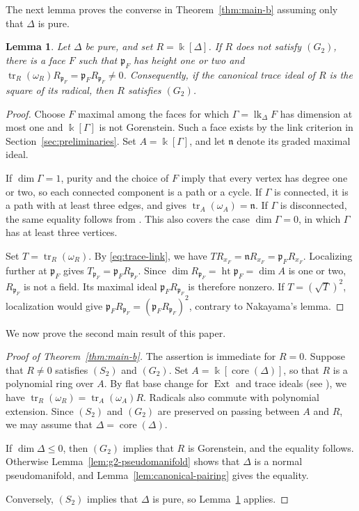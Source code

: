\documentclass[a4paper,11pt]{amsart}
\theoremstyle{plain}
\newtheorem{lemma}[theorem]{Lemma}
\theoremstyle{definition}
\theoremstyle{remark}
\DeclareMathOperator{\tr}{tr}
\DeclareMathOperator{\Ext}{Ext}
\DeclareMathOperator{\core}{core}
\newcommand{\kk}{\Bbbk}
\begin{document}
The next lemma proves the converse in Theorem~\ref{thm:main-b} assuming only that $\Delta$ is pure.

\begin{lemma}\label{lem:low-dimensional-trace}
Let $\Delta$ be pure, and set $R=\kk[\Delta]$. If $R$ does not satisfy $(G_2)$, there is a face $F$ such that $\mathfrak p_F$ has height one or two and $\tr_R(\omega_R)R_{\mathfrak p_F}=\mathfrak p_FR_{\mathfrak p_F}\ne0$. Consequently, if the canonical trace ideal of $R$ is the square of its radical, then $R$ satisfies $(G_2)$.
\end{lemma}
\begin{proof}
Choose $F$ maximal among the faces for which $\Gamma=\operatorname{lk}_\Delta F$ has dimension at most one and $\kk[\Gamma]$ is not Gorenstein. Such a face exists by the link criterion in Section~\ref{sec:preliminaries}. Set $A=\kk[\Gamma]$, and let $\mathfrak n$ denote its graded maximal ideal.

If $\dim\Gamma=1$, purity and the choice of $F$ imply that every vertex has degree one or two, so each connected component is a path or a cycle. If $\Gamma$ is connected, it is a path with at least three edges, and \cite[Theorem~4.19\,(3)]{KM26} gives $\tr_A(\omega_A)=\mathfrak n$. If $\Gamma$ is disconnected, the same equality follows from \cite[Theorem~4.21\,(2)]{KM26}. This also covers the case $\dim\Gamma=0$, in which $\Gamma$ has at least three vertices.

Set $T=\tr_R(\omega_R)$. By \eqref{eq:trace-link}, we have $TR_{x_F}=\mathfrak nR_{x_F}=\mathfrak p_FR_{x_F}$. Localizing further at $\mathfrak p_F$ gives $T_{\mathfrak p_F}=\mathfrak p_FR_{\mathfrak p_F}$. Since $\dim R_{\mathfrak p_F}=\operatorname{ht}\mathfrak p_F=\dim A$ is one or two, $R_{\mathfrak p_F}$ is not a field. Its maximal ideal $\mathfrak p_FR_{\mathfrak p_F}$ is therefore nonzero. If $T=(\sqrt T)^2$, localization would give $\mathfrak p_FR_{\mathfrak p_F}=(\mathfrak p_FR_{\mathfrak p_F})^2$, contrary to Nakayama's lemma.
\end{proof}

We now prove the second main result of this paper.

\begin{proof}[Proof of Theorem~\ref{thm:main-b}]
The assertion is immediate for $R=0$. Suppose that $R\ne0$ satisfies $(S_2)$ and $(G_2)$. Set $A=\kk[\core(\Delta)]$, so that $R$ is a polynomial ring over $A$. By flat base change for $\Ext$ and trace ideals (see \cite[Lemma~1.5\,(iii)]{HHS}), we have $\tr_R(\omega_R)=\tr_A(\omega_A)R$. Radicals also commute with polynomial extension. Since $(S_2)$ and $(G_2)$ are preserved on passing between $A$ and $R$, we may assume that $\Delta=\core(\Delta)$.

If $\dim\Delta\leq0$, then $(G_2)$ implies that $R$ is Gorenstein, and the equality follows. Otherwise Lemma~\ref{lem:g2-pseudomanifold} shows that $\Delta$ is a normal pseudomanifold, and Lemma~\ref{lem:canonical-pairing} gives the equality.

Conversely, $(S_2)$ implies that $\Delta$ is pure, so Lemma~\ref{lem:low-dimensional-trace} applies.
\end{proof}
\end{document}
